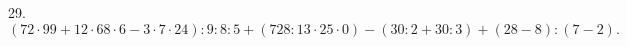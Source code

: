 29. $(72\cdot99+12\cdot68\cdot6-3\cdot7\cdot24):9:8:5+(728:13\cdot25\cdot0)-(30:2+30:3)+(28-8):(7-2).$\\
